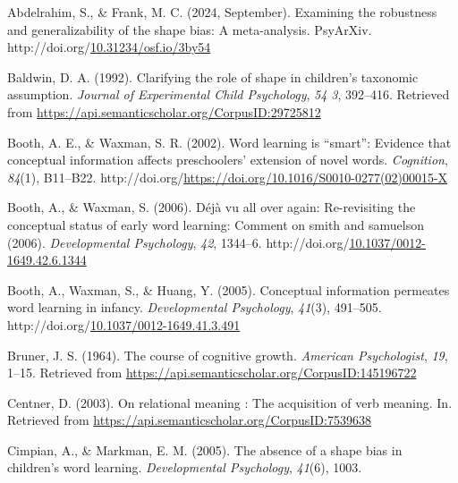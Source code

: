 \documentclass[10pt, letterpaper]{article}
\newenvironment{CSLReferences}%
  {}%
  {\par}
\begin{document}
\hypertarget{refs}{}
\begin{CSLReferences}{1}{0}
\leavevmode{}%
Abdelrahim, S., \& Frank, M. C. (2024, September). Examining the
robustness and generalizability of the shape bias: A meta-analysis.
PsyArXiv.
http://doi.org/\href{https://doi.org/10.31234/osf.io/3by54}{10.31234/osf.io/3by54}

\leavevmode{}%
Baldwin, D. A. (1992). Clarifying the role of shape in children's
taxonomic assumption. \emph{Journal of Experimental Child Psychology},
\emph{54 3}, 392--416. Retrieved from
\url{https://api.semanticscholar.org/CorpusID:29725812}

\leavevmode{}%
Booth, A. E., \& Waxman, S. R. (2002). Word learning is {``smart''}:
Evidence that conceptual information affects preschoolers' extension of
novel words. \emph{Cognition}, \emph{84}(1), B11--B22.
http://doi.org/\url{https://doi.org/10.1016/S0010-0277(02)00015-X}

\leavevmode{}%
Booth, A., \& Waxman, S. (2006). Déjà vu all over again: Re-revisiting
the conceptual status of early word learning: Comment on smith and
samuelson (2006). \emph{Developmental Psychology}, \emph{42}, 1344--6.
http://doi.org/\href{https://doi.org/10.1037/0012-1649.42.6.1344}{10.1037/0012-1649.42.6.1344}

\leavevmode{}%
Booth, A., Waxman, S., \& Huang, Y. (2005). Conceptual information
permeates word learning in infancy. \emph{Developmental Psychology},
\emph{41}(3), 491--505.
http://doi.org/\href{https://doi.org/10.1037/0012-1649.41.3.491}{10.1037/0012-1649.41.3.491}

\leavevmode{}%
Bruner, J. S. (1964). The course of cognitive growth. \emph{American
Psychologist}, \emph{19}, 1--15. Retrieved from
\url{https://api.semanticscholar.org/CorpusID:145196722}

\leavevmode{}%
Centner, D. (2003). On relational meaning : The acquisition of verb
meaning. In. Retrieved from
\url{https://api.semanticscholar.org/CorpusID:7539638}

\leavevmode{}%
Cimpian, A., \& Markman, E. M. (2005). The absence of a shape bias in
children's word learning. \emph{Developmental Psychology}, \emph{41}(6),
1003.


\end{CSLReferences}
\end{document}
